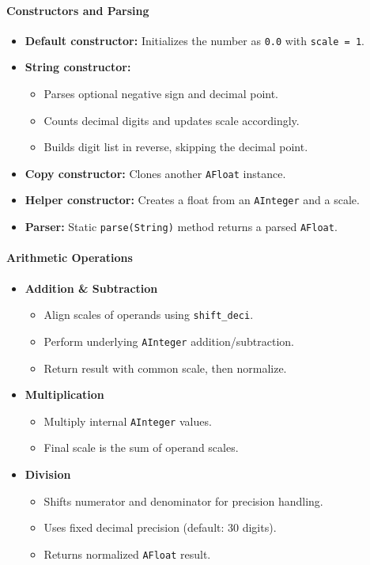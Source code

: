 \documentclass[12pt]{article}
\begin{document}
\paragraph*{\textbf{Constructors and Parsing}}
\begin{itemize}
  \item \textbf{Default constructor:} Initializes the number as \texttt{0.0} with \texttt{scale = 1}.
  \item \textbf{String constructor:}
  \begin{itemize}
    \item Parses optional negative sign and decimal point.
    \item Counts decimal digits and updates scale accordingly.
    \item Builds digit list in reverse, skipping the decimal point.
  \end{itemize}
  \item \textbf{Copy constructor:} Clones another \texttt{AFloat} instance.
  \item \textbf{Helper constructor:} Creates a float from an \texttt{AInteger} and a scale.
  \item \textbf{Parser:} Static \texttt{parse(String)} method returns a parsed \texttt{AFloat}.
\end{itemize}

\paragraph*{\textbf{Arithmetic Operations}}
\begin{itemize}
  \item \textbf{Addition \& Subtraction}
  \begin{itemize}
    \item Align scales of operands using \texttt{shift\_deci}.
    \item Perform underlying \texttt{AInteger} addition/subtraction.
    \item Return result with common scale, then normalize.
  \end{itemize}

  \item \textbf{Multiplication}
  \begin{itemize}
    \item Multiply internal \texttt{AInteger} values.
    \item Final scale is the sum of operand scales.
  \end{itemize}

  \item \textbf{Division}
  \begin{itemize}
    \item Shifts numerator and denominator for precision handling.
    \item Uses fixed decimal precision (default: 30 digits).
    \item Returns normalized \texttt{AFloat} result.
  \end{itemize}
\end{itemize}
\end{document}
